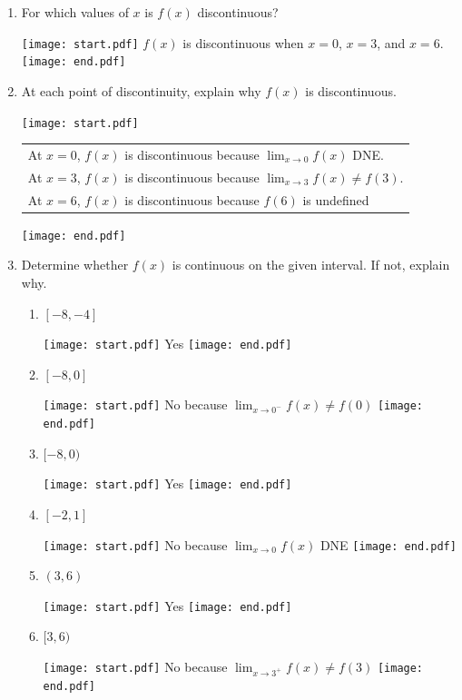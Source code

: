 \documentclass[12pt]{article}
\begin{document}
\begin{enumerate}

\item For which values of $x$ is $f(x)$ discontinuous?

\texttt{[image: start.pdf]}
{{$f(x)$ is discontinuous when $x=0$, $x=3$, and $x=6$.} }
\texttt{[image: end.pdf]}


\item At each point of discontinuity, explain why $f(x)$ is discontinuous.

\texttt{[image: start.pdf]}
{{\begin{tabular}{l}
At $x=0$, $f(x)$ is discontinuous because $\displaystyle \lim_{x \rightarrow 0}{f(x)}$ DNE.\\
At $x=3$, $f(x)$ is discontinuous because $\displaystyle \lim_{x \rightarrow 3}{f(x)} \neq f(3)$.\\
At $x=6$, $f(x)$ is discontinuous because $f(6)$ is undefined
\end{tabular}}}
\texttt{[image: end.pdf]}


\item Determine whether $f(x)$ is continuous on the given interval.  If not, explain why.

\begin{enumerate}

\item $[-8,-4]$

\texttt{[image: start.pdf]}
{{Yes}}
\texttt{[image: end.pdf]}


\item $[-8,0]$

\texttt{[image: start.pdf]}
{{No because $\displaystyle \lim_{x \rightarrow 0^-}{f(x)} \neq f(0)$}}
\texttt{[image: end.pdf]}


\item $[-8,0)$

\texttt{[image: start.pdf]}
{{Yes}}
\texttt{[image: end.pdf]}


\item $[-2,1]$

\texttt{[image: start.pdf]}
{{No because $\displaystyle \lim_{x\rightarrow 0}{f(x)}$ DNE}}
\texttt{[image: end.pdf]}


\item $(3,6)$

\texttt{[image: start.pdf]}
{{Yes}}
\texttt{[image: end.pdf]}


\item $[3,6)$

\texttt{[image: start.pdf]}
{{No because $\displaystyle \lim_{x\rightarrow 3^+}{f(x)} \neq f(3)$}}
\texttt{[image: end.pdf]}



\end{enumerate}
\end{enumerate}
\end{document}
